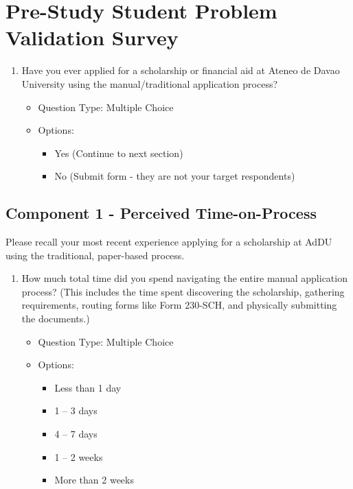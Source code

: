 \chapter{Pre-Study Student Problem Validation Survey}
\label{app:pre-survey}

\begin{enumerate}[series=q, label={Question \arabic*:}, leftmargin=*, align=left]
  \item Have you ever applied for a scholarship or financial aid at Ateneo de Davao University using the manual/traditional application process?
  \begin{itemize}[leftmargin=*]
    \item Question Type: Multiple Choice
    \item Options:
    \begin{itemize}[leftmargin=*]
      \item Yes (Continue to next section)
      \item No (Submit form - they are not your target respondents)
    \end{itemize}
  \end{itemize}
\end{enumerate}

\section{Component 1 - Perceived Time-on-Process}

Please recall your most recent experience applying for a scholarship at AdDU using the traditional, paper-based process.

\begin{enumerate}[resume=q, label={Question \arabic*:}, leftmargin=*, align=left]
  \item How much total time did you spend navigating the entire manual application process? (This includes the time spent discovering the scholarship, gathering requirements, routing forms like Form 230-SCH, and physically submitting the documents.)
  \begin{itemize}[leftmargin=*]
    \item Question Type: Multiple Choice
    \item Options:
    \begin{itemize}[leftmargin=*]
      \item Less than 1 day
      \item 1 -- 3 days
      \item 4 -- 7 days
      \item 1 -- 2 weeks
      \item More than 2 weeks
    \end{itemize}
  \end{itemize}
\end{enumerate}

